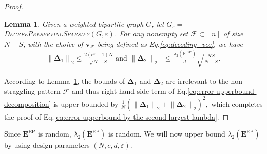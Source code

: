 \documentclass[lettersize,journal]{IEEEtran}
\renewcommand{\v}{\boldsymbol{v}}
\newcommand{\norm}[1]{\left\lVert#1\right\rVert}
\newcommand{\F}{\mathcal{F}}
\newcommand{\GEP}{\boldsymbol{E}^{\mathrm{EP}}}
\newtheorem{lemma}{Lemma}
\begin{document}
\begin{proof}
\begin{lemma}
\label{lemma:diff-decoded-result-bound}
Given a weighted bipartite graph $G$, let $G_\varepsilon = $ \textsc{DegreePreservingSparsify}$(G, \varepsilon)$. For any nonempty set $\F\subset[n]$ of size $N-S$, with the choice of $\v_\F$ being defined as Eq.\eqref{eq:decoding_vec}, we have
\begin{align*}
        \norm{\boldsymbol{\Delta}_1}_2 \leq  \tfrac{2(e^\varepsilon-1)N}{\sqrt{N-S}}\text{ and } \norm{\boldsymbol{\Delta}_2}_2 &\leq \tfrac{\lambda_2(\GEP)}{d} \sqrt{\tfrac{NS}{N-S}}.
\end{align*}
\end{lemma}
According to Lemma~\ref{lemma:diff-decoded-result-bound}, the bounds of $\boldsymbol{\Delta}_1$ and $\boldsymbol{\Delta}_2$ are irrelevant to the non-straggling pattern $\F$ and thus right-hand-side term of Eq.\eqref{eq:error-upperbound-decomposition} is upper bounded by
$\tfrac{1}{N}
\left(
   \norm{\boldsymbol{\Delta}_1}_2 + \norm{\boldsymbol{\Delta}_2}_2
\right)^2,$
which completes the proof of Eq.\eqref{eq:error-upperbound-by-the-second-largest-lambda}.
\end{proof}

Since $\GEP$ is random, $\lambda_2(\GEP)$ is random. We will now upper bound $\lambda_2(\GEP)$ by using design parameters $(N,c, d,\varepsilon)$.
\end{document}
